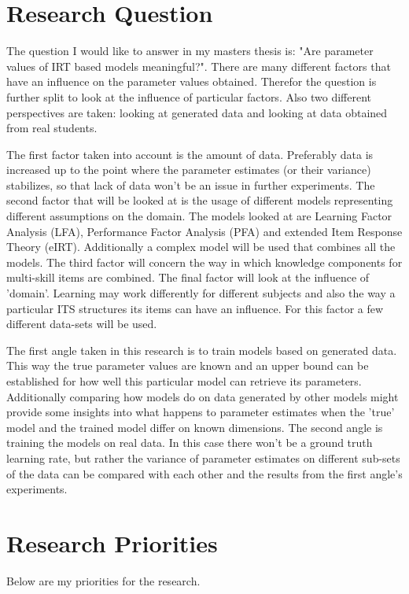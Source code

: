 \documentclass{article}
\begin{document}
\section{Research Question}
\label{sec:RQ}
The question I would like to answer in my masters thesis is: "Are parameter values of IRT based models meaningful?". There are many different factors that have an influence on the parameter values obtained. Therefor the question is further split to look at the influence of particular factors. Also two different perspectives are taken: looking at generated data and looking at data obtained from real students.

The first factor taken into account is the amount of data. Preferably data is increased up to the point where the parameter estimates (or their variance) stabilizes, so that lack of data won't be an issue in further experiments. The second factor that will be looked at is the usage of different models representing different assumptions on the domain. The models looked at are Learning Factor Analysis (LFA), Performance Factor Analysis (PFA) and extended Item Response Theory (eIRT). Additionally a complex model will be used that combines all the models. The third factor will concern the way in which knowledge components for multi-skill items are combined. The final factor will look at the influence of 'domain'. Learning may work differently for different subjects and also the way a particular ITS structures its items can have an influence. For this factor a few different data-sets will be used.

The first angle taken in this research is to train models based on generated data. This way the true parameter values are known and an upper bound can be established for how well this particular model can retrieve its parameters. Additionally comparing how models do on data generated by other models might provide some insights into what happens to parameter estimates when the 'true' model and the trained model differ on known dimensions. The second angle is training the models on real data. In this case there won't be a ground truth learning rate, but rather the variance of parameter estimates on different sub-sets of the data can be compared with each other and the results from the first angle's experiments.


\section{Research Priorities}
Below are my priorities for the research.
\end{document}

